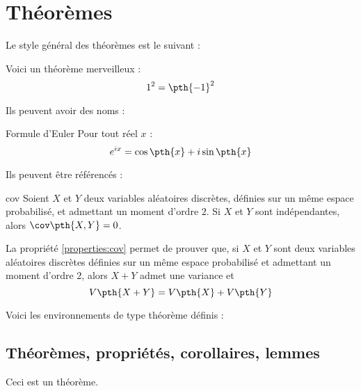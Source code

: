 
\section{Théorèmes}

    Le style général des théorèmes est le suivant :

    \begin{latexcode}
        \begin{theorem}{}{}
            Voici un théorème merveilleux : $$1^2=\pth{-1}^2$$
        \end{theorem}
    \end{latexcode}

    Ils peuvent avoir des noms :

    \begin{latexcode}
        \begin{theorem}{Formule d'Euler}{}
            Pour tout réel $x$ : $$e^{ix} = \cos\pth{x} + i\sin\pth{x}$$
        \end{theorem}
    \end{latexcode}

    Ils peuvent être référencés :

    \begin{latexcode}
        \begin{property}{}{cov}
            Soient $X$ et $Y$ deux variables aléatoires discrètes, définies sur un même espace probabilisé, et admettant un moment d'ordre $2$. Si $X$ et $Y$ sont indépendantes, alors $\cov\pth{X,Y} = 0$.
        \end{property}

        La propriété \cref{properties:cov} permet de prouver que, si $X$ et $Y$ sont deux variables aléatoires discrètes définies sur un même espace probabilisé et admettant un moment d'ordre $2$, alors $X+Y$ admet une variance et $$V\pth{X+Y} = V\pth{X} + V\pth{Y}$$
    \end{latexcode}

    Voici les environnements de type théorème définis :

    \subsection{Théorèmes, propriétés, corollaires, lemmes}

    \begin{latexcode}
        \begin{theorem}{}{}
            Ceci est un théorème.
        \end{theorem}
    \end{latexcode}

